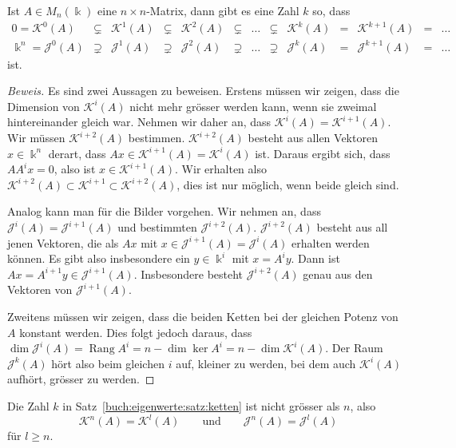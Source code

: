 \begin{satz}
\label{buch:eigenwerte:satz:ketten}
Ist $A\in M_n(\Bbbk)$ eine $n\times n$-Matrix, dann gibt es eine Zahl $k$
so, dass
\[
\begin{array}{rcccccccccccl}
0=\mathcal{K}^0(A)
&\subsetneq& \mathcal{K}^1(A) &\subsetneq& \mathcal{K}^2(A)
&\subsetneq&\dots&\subsetneq&
\mathcal{K}^k(A) &=& \mathcal{K}^{k+1}(A) &=& \dots
\\
\Bbbk^n= \mathcal{J}^0(A)
&\supsetneq& \mathcal{J}^1(A) &\supsetneq& \mathcal{J}^2(A)
&\supsetneq&\dots&\supsetneq&
\mathcal{J}^k(A) &=& \mathcal{J}^{k+1}(A) &=& \dots
\end{array}
\]
ist.
\end{satz}

\begin{proof}[Beweis]
Es sind zwei Aussagen zu beweisen.
Erstens müssen wir zeigen, dass die Dimension von $\mathcal{K}^i(A)$ 
nicht mehr grösser werden kann, wenn sie zweimal hintereinander gleich war.
Nehmen wir daher an, dass $\mathcal{K}^i(A) = \mathcal{K}^{i+1}(A)$.
Wir müssen $\mathcal{K}^{i+2}(A)$ bestimmen.
$\mathcal{K}^{i+2}(A)$ besteht aus allen Vektoren $x\in\Bbbk^n$ derart,
dass $Ax\in \mathcal{K}^{i+1}(A)=\mathcal{K}^i(A)$ ist.
Daraus ergibt sich, dass $AA^ix=0$, also ist $x\in\mathcal{K}^{i+1}(A)$.
Wir erhalten also
$\mathcal{K}^{i+2}(A)\subset\mathcal{K}^{i+1}\subset\mathcal{K}^{i+2}(A)$,
dies ist nur möglich, wenn beide gleich sind.

Analog kann man für die Bilder vorgehen.
Wir nehmen an, dass $\mathcal{J}^i(A) = \mathcal{J}^{i+1}(A)$ und
bestimmten $\mathcal{J}^{i+2}(A)$.
$\mathcal{J}^{i+2}(A)$ besteht aus all jenen Vektoren, die als
$Ax$ mit $x\in\mathcal{J}^{i+1}(A)=\mathcal{J}^i(A)$ erhalten
werden können.
Es gibt also insbesondere ein $y\in\Bbbk^i$ mit $x=A^iy$.
Dann ist $Ax=A^{i+1}y\in\mathcal{J}^{i+1}(A)$.
Insbesondere besteht $\mathcal{J}^{i+2}(A)$ genau aus den Vektoren
von $\mathcal{J}^{i+1}(A)$.

Zweitens müssen wir zeigen, dass die beiden Ketten bei der gleichen
Potenz von $A$ konstant werden.
Dies folgt jedoch daraus, dass $\dim\mathcal{J}^i(A) = \operatorname{Rang} A^i
= n - \dim\ker A^i = n -\dim\mathcal{K}^i(A)$.
Der Raum $\mathcal{J}^k(A)$ hört also beim gleichen $i$ auf, kleiner
zu werden, bei dem auch $\mathcal{K}^i(A)$ aufhört, grösser zu werden.
\end{proof}

\begin{satz}
Die Zahl $k$ in Satz~\ref{buch:eigenwerte:satz:ketten}
ist nicht grösser als $n$, also
\[
\mathcal{K}^n(A) = \mathcal{K}^l(A)
\qquad\text{und}\qquad
\mathcal{J}^n(A) = \mathcal{J}^l(A)
\]
für $l\ge n$.
\end{satz}

